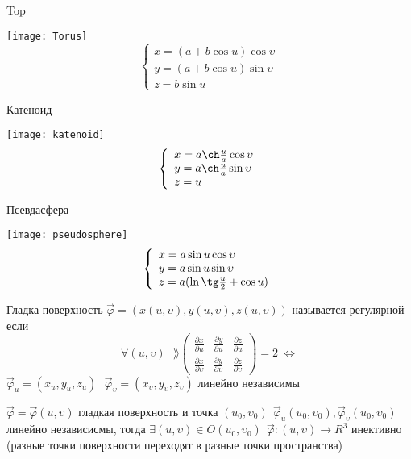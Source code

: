 \begin{block}[Примеры]
  \begin{center}
    Top
  \end{center}
  \texttt{[image: Torus]}
  $$
  \left\{
  \begin{array}{l}
    x = (a + b\cos u) \cos \upsilon \\
    y = (a + b\cos u) \sin \upsilon \\
    z = b \sin u
  \end{array}
  \right.
  $$
  \begin{center}
    Катеноид
  \end{center}
  \texttt{[image: katenoid]}
  $$
  \left\{
  \begin{array}{l}
    x = a \ch \frac{u}{a} \cos \upsilon \\
    y = a \ch \frac{u}{a} \sin \upsilon \\
    z = u
  \end{array}
  \right.
  $$
  \begin{center}
    Псевдасфера
  \end{center}
  \texttt{[image: pseudosphere]}
  $$
  \left\{
  \begin{array}{l}
    x = a \sin u \cos \upsilon \\
    y = a \sin u \sin \upsilon \\
    z = a( \ln \tg \frac{u}{2} + \cos u)
  \end{array}
  \right.
  $$
\end{block}

\begin{define}
  Гладка поверхность $\vec \varphi = (x(u, \upsilon), y(u, \upsilon),
  z(u, \upsilon))$ называется регулярной если
  $$
  \forall (u, \upsilon) ~~~
  \rang \left(
  \begin{array}{ccc}
    \frac{\partial x}{\partial u} & \frac{\partial y}{\partial u} &
    \frac{\partial z}{\partial u} \\
    \frac{\partial x}{\partial \upsilon} &
    \frac{\partial y}{\partial \upsilon} &
    \frac{\partial z}{\partial \upsilon}
  \end{array}
  \right) = 2 ~ \Leftrightarrow
  $$
  $\vec \varphi_u = (x_u, y_u, z_u) ~~~ \vec \varphi_{\upsilon} =
  (x_{\upsilon}, y_{\upsilon}, z_{\upsilon})$ линейно независимы
\end{define}

\begin{theorem}
  $\vec \varphi = \vec \varphi(u, \upsilon)$ гладкая поверхность и точка
  $(u_0, \upsilon_0) ~~ \vec \varphi_u (u_0, \upsilon_0),
  \vec \varphi_{\upsilon} (u_0, \upsilon_0)$ линейно независисмы, тогда
  $\exists (u, \upsilon) \in O(u_0, \upsilon_0) ~~ \vec \varphi : (u, \upsilon)
  \to R^3$ инективно (разные точки поверхности переходят в разные точки
  пространства)
\end{theorem}

